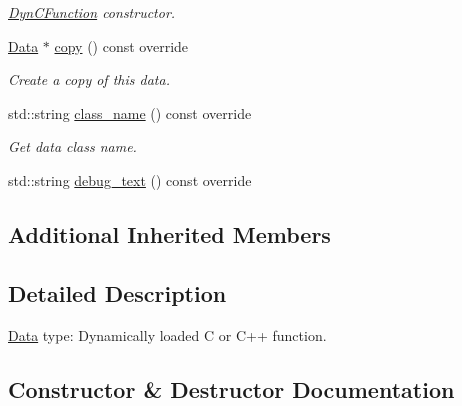 \begin{DoxyCompactItemize}
\begin{DoxyCompactList}\small\item\em {\ttfamily \hyperlink{classcreek_1_1_dyn_c_function}{Dyn\+C\+Function}} constructor. \end{DoxyCompactList}\item 
\hyperlink{classcreek_1_1_data}{Data} $\ast$ \hyperlink{classcreek_1_1_dyn_c_function_a3bab0873d428a41e94c08918625ab349}{copy} () const  override\hypertarget{classcreek_1_1_dyn_c_function_a3bab0873d428a41e94c08918625ab349}{}\label{classcreek_1_1_dyn_c_function_a3bab0873d428a41e94c08918625ab349}

\begin{DoxyCompactList}\small\item\em Create a copy of this data. \end{DoxyCompactList}\item 
std\+::string \hyperlink{classcreek_1_1_dyn_c_function_a595d9e8f18e9f7b900b9f59268a22519}{class\+\_\+name} () const  override\hypertarget{classcreek_1_1_dyn_c_function_a595d9e8f18e9f7b900b9f59268a22519}{}\label{classcreek_1_1_dyn_c_function_a595d9e8f18e9f7b900b9f59268a22519}

\begin{DoxyCompactList}\small\item\em Get data class name. \end{DoxyCompactList}\item 
std\+::string \hyperlink{classcreek_1_1_dyn_c_function_a19c3af888a7cdaadd01094fe0e0a52f0}{debug\+\_\+text} () const  override
\end{DoxyCompactItemize}
\subsection*{Additional Inherited Members}


\subsection{Detailed Description}
\hyperlink{classcreek_1_1_data}{Data} type\+: Dynamically loaded C or C++ function. 

\subsection{Constructor \& Destructor Documentation}
